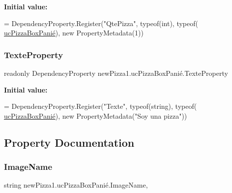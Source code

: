 {\bfseries Initial value\+:}
\begin{DoxyCode}
=
            DependencyProperty.Register(\textcolor{stringliteral}{"QtePizza"}, typeof(\textcolor{keywordtype}{int}), typeof(
      \hyperlink{classnewPizza1_1_1ucPizzaBoxPani_xC3_xA9_a56d476316603c46b5fbb8e6fbb358341}{ucPizzaBoxPanié}), \textcolor{keyword}{new} PropertyMetadata(1))
\end{DoxyCode}
\mbox{\label{classnewPizza1_1_1ucPizzaBoxPani_xC3_xA9_a7141d5cd942ddb5318f6ab0d76bf97ce}} 
\subsubsection{\texorpdfstring{Texte\+Property}{TexteProperty}}
{\footnotesize\ttfamily readonly Dependency\+Property new\+Pizza1.\+uc\+Pizza\+Box\+Panié.\+Texte\+Property\hspace{0.3cm}{\ttfamily [static]}}

{\bfseries Initial value\+:}
\begin{DoxyCode}
=
            DependencyProperty.Register(\textcolor{stringliteral}{"Texte"}, typeof(\textcolor{keywordtype}{string}), typeof(
      \hyperlink{classnewPizza1_1_1ucPizzaBoxPani_xC3_xA9_a56d476316603c46b5fbb8e6fbb358341}{ucPizzaBoxPanié}), \textcolor{keyword}{new} PropertyMetadata(\textcolor{stringliteral}{"Soy una pizza"}))
\end{DoxyCode}


\subsection{Property Documentation}
\mbox{\label{classnewPizza1_1_1ucPizzaBoxPani_xC3_xA9_a817d69a2bc6b5ec60c1237452d8c1814}} 
\subsubsection{\texorpdfstring{Image\+Name}{ImageName}}
{\footnotesize\ttfamily string new\+Pizza1.\+uc\+Pizza\+Box\+Panié.\+Image\+Name\hspace{0.3cm}{\ttfamily [get]}, {\ttfamily [set]}}

